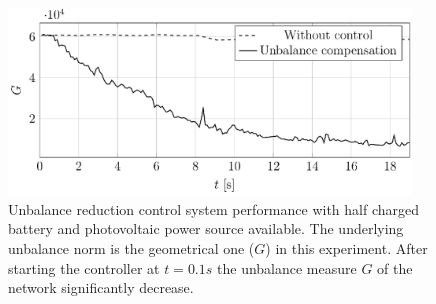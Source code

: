             \begin{figure}[ht]
            \centering
            \includegraphics[width=0.95\textwidth]{Unblance_EPS_Pics/UnbalRedComp_JCP-figure3.eps}
                 \caption{Unbalance reduction control system performance with half charged battery and photovoltaic power source available. The underlying unbalance norm is the geometrical one ($G$) in this experiment. After starting the controller at $t=0.1s$ the unbalance measure $G$ of the network significantly decrease.}
                 \label{fig:compare_asym_PV}
                \end{figure}

